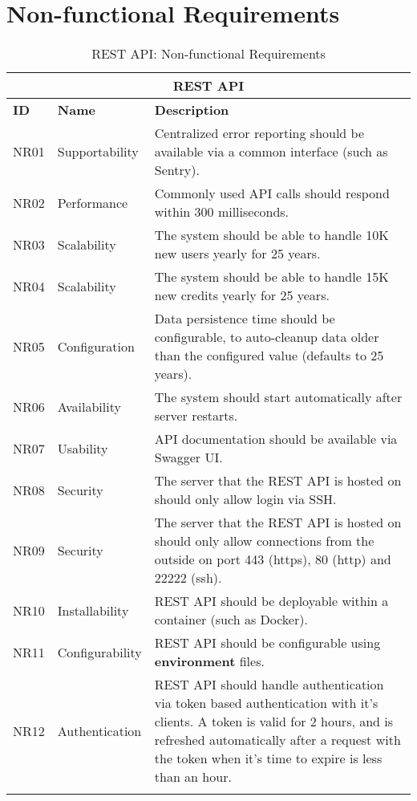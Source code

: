 \documentclass[a4paper,12pt]{article}
\begin{document}
\section{Non-functional Requirements}

\begin{longtable}{|p{1cm}|p{3.5cm}|p{11cm}|} 
    \hline

    \multicolumn{3}{|c|}{\textbf{REST API}}  \\ 
    \hline
    \textbf{ID} & \textbf{Name} & \textbf{Description} \\
    \hline
    NR01 & Supportability &  Centralized error reporting should be available via a common interface (such as Sentry).\\
    \hline
    NR02 & Performance &  Commonly used API calls should respond within 300 milliseconds. \\
    \hline
    NR03 & Scalability &  The system should be able to handle 10K new users yearly for 25 years.\\
    \hline
    NR04 & Scalability &  The system should be able to handle 15K new credits yearly for 25 years.\\
    \hline
    NR05 & Configuration & Data persistence time should be configurable, to auto-cleanup data older than the configured value (defaults to 25 years).\\
    \hline
    NR06 & Availability &  The system should start automatically after server restarts. \\
    \hline
    NR07 & Usability &  API documentation should be available via Swagger UI. \\
    \hline
    NR08 & Security &  The server that the REST API is hosted on should only allow login via SSH. \\
    \hline
    NR09 & Security &  The server that the REST API is hosted on should only allow connections from the outside on port 443 (https), 80 (http) and 22222 (ssh). \\
    \hline
    NR10 & Installability & REST API should be deployable within a container (such as Docker). \\
    \hline
    NR11 & Configurability & REST API should be configurable using \textbf{environment} files. \\
    \hline
    NR12 & Authentication & REST API should handle authentication via token based authentication with it's clients. A token is valid for 2 hours, and is refreshed automatically after a request with the token when it's time to expire is less than an hour. \\ %
    \hline
    \caption{REST API: Non-functional Requirements}
    \label{tab:rest_api_nfunreq}
\end{longtable}
\end{document}
